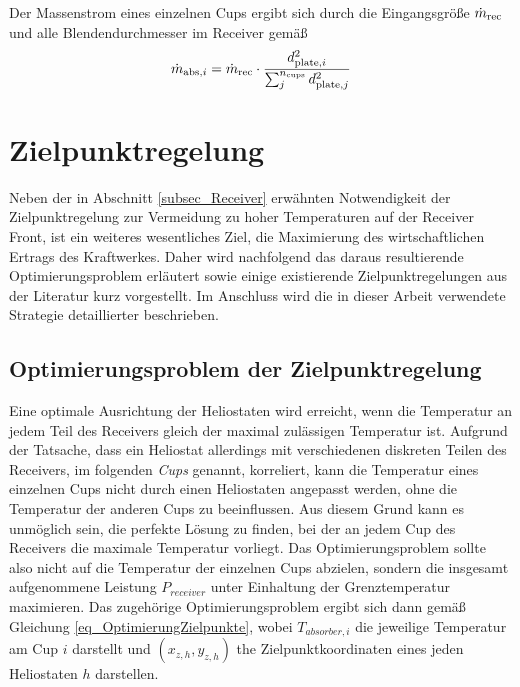 Der Massenstrom eines einzelnen Cups ergibt sich durch die Eingangsgröße $\MDotReceiver$ und alle Blendendurchmesser im Receiver gemäß
\begin{equation} \label{eq_BerechnungMassenstrom}
    \dot{m}_{\IndexAbsorber, i} =\MDotReceiver \cdot \frac{\OrificeDiameter[,i]^2}{\sum_j^{n_{\mathrm{cups}}}\OrificeDiameter[,j]^2}
\end{equation}


\section{Zielpunktregelung} \label{sec_Zielpunktregelung}
Neben der in Abschnitt \ref{subsec_Receiver} erwähnten Notwendigkeit der Zielpunktregelung zur Vermeidung zu hoher Temperaturen auf der Receiver Front, ist ein weiteres wesentliches Ziel, die Maximierung des wirtschaftlichen Ertrags des Kraftwerkes.
Daher wird nachfolgend das daraus resultierende Optimierungsproblem erläutert sowie einige existierende Zielpunktregelungen aus der Literatur kurz vorgestellt.
Im Anschluss wird die in dieser Arbeit verwendete Strategie detaillierter beschrieben.

\subsection{Optimierungsproblem der Zielpunktregelung} \label{subsec_OptimierungZielpunkte}
Eine optimale Ausrichtung der Heliostaten wird erreicht, wenn die Temperatur an jedem Teil des Receivers gleich der maximal zulässigen Temperatur ist.
Aufgrund der Tatsache, dass ein Heliostat allerdings mit verschiedenen diskreten Teilen des Receivers, im folgenden \textit{Cups} genannt, korreliert, kann die Temperatur eines einzelnen Cups nicht durch einen Heliostaten angepasst werden, ohne die Temperatur der anderen Cups zu beeinflussen.
Aus diesem Grund kann es unmöglich sein, die perfekte Lösung zu finden, bei der an jedem Cup des Receivers die maximale Temperatur vorliegt.
Das Optimierungsproblem sollte also nicht auf die Temperatur der einzelnen Cups abzielen, sondern die insgesamt aufgenommene Leistung $P_{receiver}$ unter Einhaltung der Grenztemperatur maximieren.
Das zugehörige Optimierungsproblem ergibt sich dann gemäß Gleichung \ref{eq_OptimierungZielpunkte}, wobei $T_{absorber,i}$ die jeweilige Temperatur am Cup $i$ darstellt und $(x_{z,h}, y_{z,h})$ the Zielpunktkoordinaten eines jeden Heliostaten $h$ darstellen. \cite[S.15]{DissZanger}

